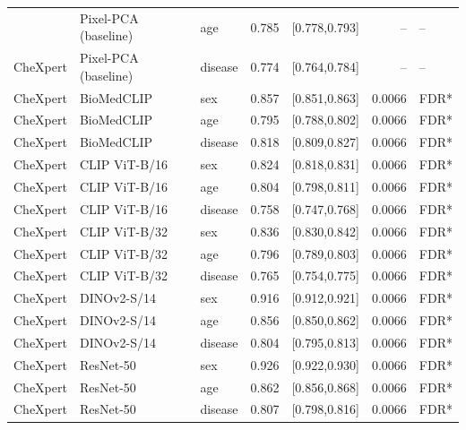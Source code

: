 \begin{table}[t]
\begin{tabular}{lllrlrl}
{    CheXpert & Pixel-PCA (baseline) & age & 0.785 & [0.778,0.793] & -- & -- \\
    CheXpert & Pixel-PCA (baseline) & disease & 0.774 & [0.764,0.784] & -- & -- \\
    CheXpert & BioMedCLIP & sex & 0.857 & [0.851,0.863] & 0.0066 & FDR* \\
    CheXpert & BioMedCLIP & age & 0.795 & [0.788,0.802] & 0.0066 & FDR* \\
    CheXpert & BioMedCLIP & disease & 0.818 & [0.809,0.827] & 0.0066 & FDR* \\
    CheXpert & CLIP ViT-B/16 & sex & 0.824 & [0.818,0.831] & 0.0066 & FDR* \\
    CheXpert & CLIP ViT-B/16 & age & 0.804 & [0.798,0.811] & 0.0066 & FDR* \\
    CheXpert & CLIP ViT-B/16 & disease & 0.758 & [0.747,0.768] & 0.0066 & FDR* \\
    CheXpert & CLIP ViT-B/32 & sex & 0.836 & [0.830,0.842] & 0.0066 & FDR* \\
    CheXpert & CLIP ViT-B/32 & age & 0.796 & [0.789,0.803] & 0.0066 & FDR* \\
    CheXpert & CLIP ViT-B/32 & disease & 0.765 & [0.754,0.775] & 0.0066 & FDR* \\
    CheXpert & DINOv2-S/14 & sex & 0.916 & [0.912,0.921] & 0.0066 & FDR* \\
    CheXpert & DINOv2-S/14 & age & 0.856 & [0.850,0.862] & 0.0066 & FDR* \\
    CheXpert & DINOv2-S/14 & disease & 0.804 & [0.795,0.813] & 0.0066 & FDR* \\
    CheXpert & ResNet-50 & sex & 0.926 & [0.922,0.930] & 0.0066 & FDR* \\
    CheXpert & ResNet-50 & age & 0.862 & [0.856,0.868] & 0.0066 & FDR* \\
    CheXpert & ResNet-50 & disease & 0.807 & [0.798,0.816] & 0.0066 & FDR* \\
    \bottomrule
  \end{tabular}
\end{table}
